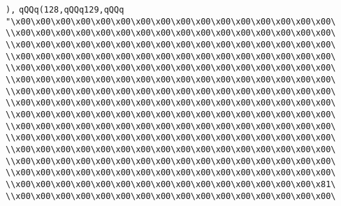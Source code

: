 \verb|),|\newline
\verb|qQQq(128,qQQq129,qQQq|\newline
\verb|"\x00\x00\x00\x00\x00\x00\x00\x00\x00\x00\x00\x00\x00\x00\x00\x00\|\newline
\verb|\\x00\x00\x00\x00\x00\x00\x00\x00\x00\x00\x00\x00\x00\x00\x00\x00\|\newline
\verb|\\x00\x00\x00\x00\x00\x00\x00\x00\x00\x00\x00\x00\x00\x00\x00\x00\|\newline
\verb|\\x00\x00\x00\x00\x00\x00\x00\x00\x00\x00\x00\x00\x00\x00\x00\x00\|\newline
\verb|\\x00\x00\x00\x00\x00\x00\x00\x00\x00\x00\x00\x00\x00\x00\x00\x00\|\newline
\verb|\\x00\x00\x00\x00\x00\x00\x00\x00\x00\x00\x00\x00\x00\x00\x00\x00\|\newline
\verb|\\x00\x00\x00\x00\x00\x00\x00\x00\x00\x00\x00\x00\x00\x00\x00\x00\|\newline
\verb|\\x00\x00\x00\x00\x00\x00\x00\x00\x00\x00\x00\x00\x00\x00\x00\x00\|\newline
\verb|\\x00\x00\x00\x00\x00\x00\x00\x00\x00\x00\x00\x00\x00\x00\x00\x00\|\newline
\verb|\\x00\x00\x00\x00\x00\x00\x00\x00\x00\x00\x00\x00\x00\x00\x00\x00\|\newline
\verb|\\x00\x00\x00\x00\x00\x00\x00\x00\x00\x00\x00\x00\x00\x00\x00\x00\|\newline
\verb|\\x00\x00\x00\x00\x00\x00\x00\x00\x00\x00\x00\x00\x00\x00\x00\x00\|\newline
\verb|\\x00\x00\x00\x00\x00\x00\x00\x00\x00\x00\x00\x00\x00\x00\x00\x00\|\newline
\verb|\\x00\x00\x00\x00\x00\x00\x00\x00\x00\x00\x00\x00\x00\x00\x00\x00\|\newline
\verb|\\x00\x00\x00\x00\x00\x00\x00\x00\x00\x00\x00\x00\x00\x00\x00\x81\|\newline
\verb|\\x00\x00\x00\x00\x00\x00\x00\x00\x00\x00\x00\x00\x00\x00\x00\x00\|\newline

